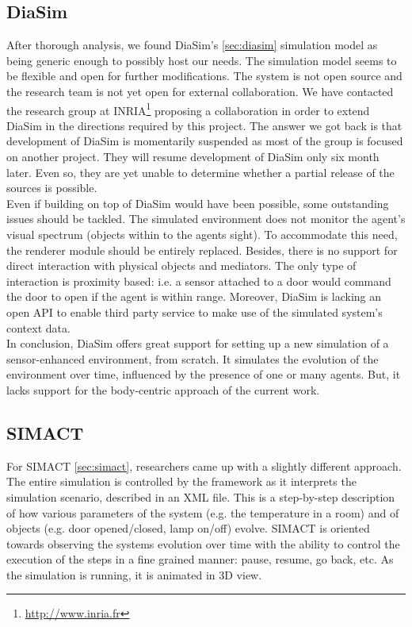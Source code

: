\subsection{DiaSim}\label{subsec:discussion_diasim}
After thorough analysis, we found DiaSim's \ref{sec:diasim} simulation model as being generic enough to possibly host our needs. The simulation model seems to be flexible and open for further modifications. The system is not open source and the research team is not yet open for external collaboration. We have contacted the research group at INRIA\footnote{\url{http://www.inria.fr}} proposing a collaboration in order to extend DiaSim in the directions required by this project. The answer we got back is that development of DiaSim is momentarily suspended as most of the group is focused on another project. They will resume development of DiaSim only six month later. Even so, they are yet unable to determine whether a partial release of the sources is possible.\\

Even if building on top of DiaSim would have been possible, some outstanding issues should be tackled. The simulated environment does not monitor the agent's visual spectrum (objects within to the agents sight). To accommodate this need, the renderer module should be entirely replaced. Besides, there is no support for direct interaction with physical objects and mediators. The only type of interaction is proximity based: i.e. a sensor attached to a door would command the door to open if the agent is within range. Moreover, DiaSim is lacking an open API to enable third party service to make use of the simulated system's context data.\\

In conclusion, DiaSim offers great support for setting up a new simulation of a sensor-enhanced environment, from scratch. It simulates the evolution of the environment over time, influenced by the presence of one or many agents. But, it lacks support for the body-centric approach of the current work.\\
\subsection{SIMACT}\label{subsec:discussion_simact}
For SIMACT \ref{sec:simact}, researchers came up with a slightly different approach. The entire simulation is controlled by the framework as it interprets the simulation scenario, described in an XML file. This is a step-by-step description of how various parameters of the system (e.g. the temperature in a room) and of objects (e.g. door opened/closed, lamp on/off) evolve. SIMACT is oriented towards observing the systems evolution over time with the ability to control the execution of the steps in a fine grained manner: pause, resume, go back, etc. As the simulation is running, it is animated in 3D view.\\

